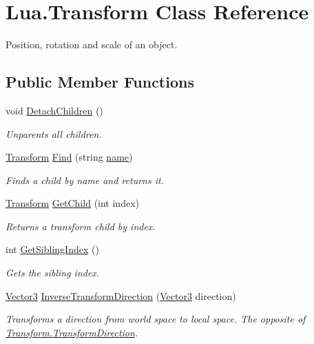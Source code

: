 \hypertarget{class_lua_1_1_transform}{}\section{Lua.\+Transform Class Reference}
\label{class_lua_1_1_transform}


Position, rotation and scale of an object.  


\subsection*{Public Member Functions}
\begin{DoxyCompactItemize}
\item 
void \mbox{\hyperlink{class_lua_1_1_transform_a13e71ef2426543323d6f74d05d9904d0}{Detach\+Children}} ()
\begin{DoxyCompactList}\small\item\em Unparents all children. \end{DoxyCompactList}\item 
\mbox{\hyperlink{class_lua_1_1_transform}{Transform}} \mbox{\hyperlink{class_lua_1_1_transform_a79476caab32d323b7fee1955fda8d808}{Find}} (string \mbox{\hyperlink{class_lua_1_1_transform_af1ca076a9406c3865fef9cbf8393e484}{name}})
\begin{DoxyCompactList}\small\item\em Finds a child by name and returns it. \end{DoxyCompactList}\item 
\mbox{\hyperlink{class_lua_1_1_transform}{Transform}} \mbox{\hyperlink{class_lua_1_1_transform_a2535f3bade200a7f2c2c59debaeed41a}{Get\+Child}} (int index)
\begin{DoxyCompactList}\small\item\em Returns a transform child by index. \end{DoxyCompactList}\item 
int \mbox{\hyperlink{class_lua_1_1_transform_a839d8eeda6ca8e0ea2a2e7b50643b0ca}{Get\+Sibling\+Index}} ()
\begin{DoxyCompactList}\small\item\em Gets the sibling index. \end{DoxyCompactList}\item 
\mbox{\hyperlink{class_lua_1_1_vector3}{Vector3}} \mbox{\hyperlink{class_lua_1_1_transform_a7bf8b1d272b1d893a606c5f38770c433}{Inverse\+Transform\+Direction}} (\mbox{\hyperlink{class_lua_1_1_vector3}{Vector3}} direction)
\begin{DoxyCompactList}\small\item\em Transforms a direction from world space to local space. The opposite of \mbox{\hyperlink{class_lua_1_1_transform_a14270ac6dbade453decf26513f533b66}{Transform.\+Transform\+Direction}}. \end{DoxyCompactList}\item 

\end{DoxyCompactItemize}
